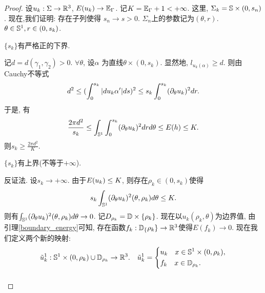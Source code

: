 \begin{proof}
    设$u_k: \Sigma \to \R^3$, $E(u_k) \to \EE_{\Gamma}$.  记$K=\EE_{\Gamma}+1 < +\infty$. 这里, $\Sigma_k = \S\times (0,s_n)$. 现在,我们证明: 存在子列使得 $s_n \to s >0$.  $\Sigma_n$上的参数记为$(\theta,r)$. $\theta \in \S^1, r \in (0,s_k)$.
    \begin{claim}
        $\{s_k\}$有严格正的下界.
        \begin{subproof}
            记$d=d(\gamma_1,\gamma_2)>0$. $\forall \theta$, 设$\alpha$ 为直线$\theta \times (0, s_k)$. 显然地, $l_{u_k(\alpha)} \ge d$. 则由Cauchy不等式
            \begin{equation}
                d^2 \le (\int^{s_k}_0 \abs{du_k \alpha'} ds)^2 \le s_k \int^{s_k}_0 (\PTT{u_k})^2dr.
            \end{equation}
            于是, 有
            \begin{equation}
                \frac{2\pi d^2}{s_k} \le \int_{\S^1}\int^{s_k}_0 (\PTT{u_k})^2 drd\theta \le E(h) \le K.
            \end{equation}
            则$s_k \ge \frac{2\pi d^2}{K}$.
        \end{subproof}
    \end{claim}
    \begin{claim}
        $\{s_k\}$有上界(不等于$+\infty$).
        \begin{subproof}
            反证法.  设$s_k \to +\infty$. 由于$\E(u_k) \le K$,  则存在$\rho_k \in (0, s_k)$使得
            \begin{equation}
                s_k\int_{\S^1} (\PTT{u_k})^2(\theta,\rho_k) d\theta \le K.
            \end{equation}
            则有$\int_{\S^1} (\PTT{u_k})^2(\theta,\rho_k) d\theta  \to 0$. 记$D_{\rho_k}=\D \times \{\rho_k\}$. 现在以$u_k(\rho_k,\theta)$为边界值, 由引理\eqref{boundary_energy}可知, 存在函数$f_k: \D_\{\rho_k\} \to \R^3$使得$E(f_k) \to 0$. 现在我们定义两个新的映射:
            \begin{equation}
                \tilde{u}_k^1: \S^1 \times (0,\rho_k) \cup \D_{\rho_k}\to \R^3.  \s  \tilde{u}_k^1=\left\{
                    \begin{aligned}
                        &u_k\s x \in \S^1 \times (0,\rho_k),\\
                        &f_k\s x \in \D_{\rho_k}.
                    \end{aligned}
                \right.
            \end{equation}
            \begin{equation}

\end{equation}
\end{subproof}
\end{claim}
\end{proof}
